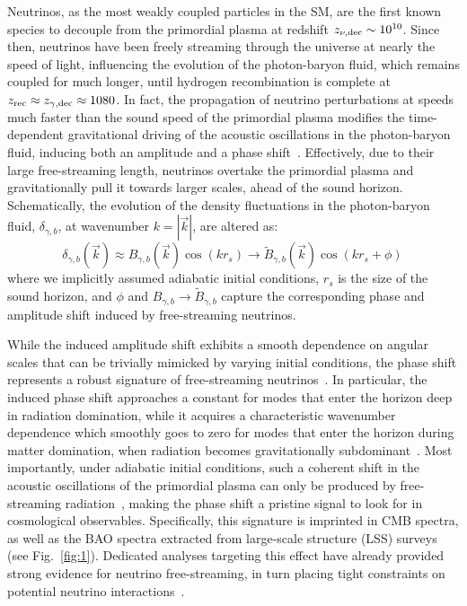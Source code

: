 \documentclass[floats,floatfix,showpacs,amssymb,prd,twocolumn,superscriptaddress,nofootinbib,reprint,preprintnumbers]{revtex4-2}
\begin{document}
\noindent Neutrinos, as the most weakly coupled particles in the SM, are the first known species to decouple from the primordial plasma at redshift $z_{\nu,\rm dec}\sim 10^{10}$. Since then, neutrinos have been freely streaming through the universe at nearly the speed of light, influencing the evolution of the photon-baryon fluid, which remains coupled for much longer, until hydrogen recombination is complete at $z_{\rm rec}\approx z_{\gamma,\rm dec}\approx1080$. In fact, the propagation of neutrino perturbations at speeds much faster than the sound speed of the primordial plasma modifies the time-dependent gravitational driving of the acoustic oscillations in the photon-baryon fluid, inducing both an amplitude and a phase shift~\cite{Bashinsky:2003tk,Baumann:2015rya}. Effectively, due to their large free-streaming length, neutrinos  overtake the primordial plasma and gravitationally pull it towards larger scales, ahead of the sound horizon. Schematically, the evolution of the density fluctuations in the photon-baryon fluid, $\delta_{\gamma,b}$, at wavenumber $k=|\vec{k}|$, are altered as:
\begin{equation}
    \delta_{\gamma,b}(\vec{k}) \approx B_{\gamma,b}(\vec{k}) \cos(k r_s) \to \tilde{B}_{\gamma,b}(\vec{k}) \cos(k r_s + \phi)\,\label{eq:phase0}
\end{equation}
where we implicitly assumed adiabatic initial conditions, $r_s$ is the size of the sound horizon, and $\phi$ and $B_{\gamma,b} \to \tilde{B}_{\gamma,b}$ capture the corresponding phase and amplitude shift induced by free-streaming neutrinos. 

While the induced amplitude shift exhibits a smooth dependence on angular scales that can be trivially mimicked by varying initial conditions, the phase shift represents a robust signature of free-streaming neutrinos~\citep{Bashinsky:2003tk,Baumann:2015rya}. In particular, the induced phase shift approaches a constant for modes that enter the horizon deep in radiation domination, while it acquires a characteristic wavenumber dependence which smoothly goes to zero for modes that enter the horizon during matter domination, when 
radiation becomes gravitationally subdominant~\cite{Baumann:2015rya}. Most importantly, under adiabatic initial conditions, such a coherent shift in the acoustic oscillations of the primordial plasma can only be produced by free-streaming radiation~\cite{Baumann:2015rya}, making the phase shift a pristine signal to look for in cosmological observables. Specifically, this signature is imprinted in CMB spectra, as well as the BAO spectra extracted from large-scale structure (LSS) surveys (see Fig.~\ref{fig:1}). Dedicated analyses targeting this effect have already provided strong evidence for neutrino free-streaming, in turn placing tight constraints on potential neutrino interactions~\cite{Follin:2015hya,Montefalcone:2025unv,Choi:2018gho,Whitford:2024ecj,Saravanan:2025cyi,montefalcone25}.
\end{document}
